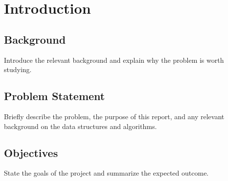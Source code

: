 \section{Introduction}

\subsection{Background}

Introduce the relevant background and explain why the problem is worth
studying.

\subsection{Problem Statement}

Briefly describe the problem, the purpose of this report, and any relevant
background on the data structures and algorithms.

\subsection{Objectives}

State the goals of the project and summarize the expected outcome.

